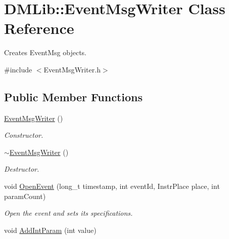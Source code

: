 \hypertarget{class_d_m_lib_1_1_event_msg_writer}{\section{D\-M\-Lib\-:\-:Event\-Msg\-Writer Class Reference}
\label{class_d_m_lib_1_1_event_msg_writer}
}


Creates Event\-Msg objects.  




{\ttfamily \#include $<$Event\-Msg\-Writer.\-h$>$}

\subsection*{Public Member Functions}
\begin{DoxyCompactItemize}
\item 
\hypertarget{class_d_m_lib_1_1_event_msg_writer_a6d32817f98e810322d8cdbd434421062}{\hyperlink{class_d_m_lib_1_1_event_msg_writer_a6d32817f98e810322d8cdbd434421062}{Event\-Msg\-Writer} ()}\label{class_d_m_lib_1_1_event_msg_writer_a6d32817f98e810322d8cdbd434421062}

\begin{DoxyCompactList}\small\item\em Constructor. \end{DoxyCompactList}\item 
\hypertarget{class_d_m_lib_1_1_event_msg_writer_a6ec1eb44106b2a645d460ab94b79f3c7}{\hyperlink{class_d_m_lib_1_1_event_msg_writer_a6ec1eb44106b2a645d460ab94b79f3c7}{$\sim$\-Event\-Msg\-Writer} ()}\label{class_d_m_lib_1_1_event_msg_writer_a6ec1eb44106b2a645d460ab94b79f3c7}

\begin{DoxyCompactList}\small\item\em Destructor. \end{DoxyCompactList}\item 
void \hyperlink{class_d_m_lib_1_1_event_msg_writer_a985cc5f25f0686a704cdacb811bf0063}{Open\-Event} (long\-\_\-t timestamp, int event\-Id, Instr\-Place place, int param\-Count)
\begin{DoxyCompactList}\small\item\em Open the event and sets its specifications. \end{DoxyCompactList}\item 
\hypertarget{class_d_m_lib_1_1_event_msg_writer_a8d07be13e565f1b85fd08912776f029c}{void \hyperlink{class_d_m_lib_1_1_event_msg_writer_a8d07be13e565f1b85fd08912776f029c}{Add\-Int\-Param} (int value)}\label{class_d_m_lib_1_1_event_msg_writer_a8d07be13e565f1b85fd08912776f029c}


\end{DoxyCompactItemize}
